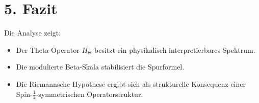 \documentclass[12pt]{article}
\begin{document}
\section*{5. Fazit}

Die Analyse zeigt:
\begin{itemize}
  \item Der Theta-Operator \( H_\Theta \) besitzt ein physikalisch interpretierbares Spektrum.
  \item Die modulierte Beta-Skala stabilisiert die Spurformel.
  \item Die Riemannsche Hypothese ergibt sich als strukturelle Konsequenz einer Spin-$\frac{1}{2}$-symmetrischen Operatorstruktur.
\end{itemize}
\end{document}
